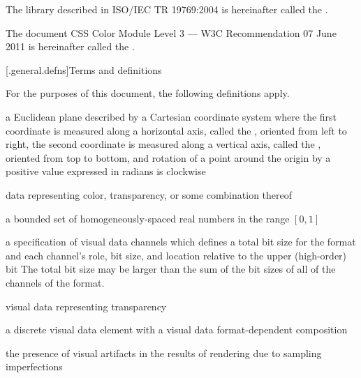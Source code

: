 \pnum
The library described in ISO/IEC TR 19769:2004 is hereinafter called the
.

\pnum
The document CSS Color Module Level 3 --- W3C Recommendation 07 June 2011 is 
hereinafter called the .

[\iotwod.general.defns]{Terms and definitions}

\pnum
{}
For the purposes of this document, the following definitions apply.

a Euclidean plane described by a Cartesian coordinate system where the first coordinate is measured along a horizontal axis, called the \xaxis, oriented from left to right, the second coordinate is measured along a vertical axis, called the \yaxis, oriented from top to bottom, and rotation of a point around the origin by a positive value expressed in radians is clockwise

data representing color, transparency, or some combination thereof

a bounded set of homogeneously-spaced real numbers in the range $[0,1]$

%
a specification of visual data channels which defines a total bit size for the format and each channel's role, bit size, and location relative to the upper (high-order) bit
\enternote
The total bit size may be larger than the sum of the bit sizes of all of the channels of the format.
\exitnote

visual data representing transparency

a discrete visual data element with a visual data format-dependent composition

the presence of visual artifacts in the results of rendering due to 
sampling imperfections

